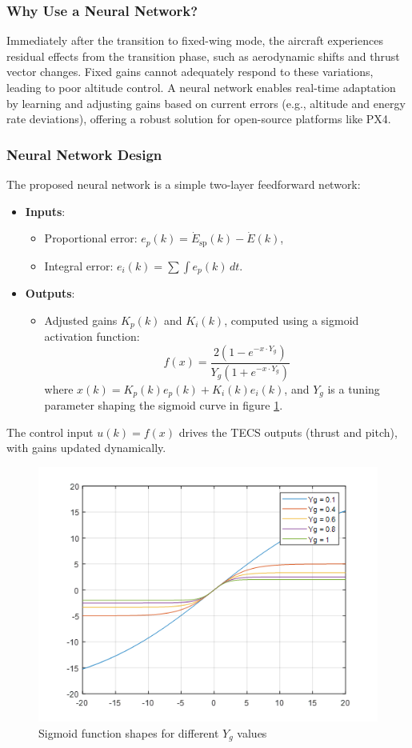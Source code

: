 \documentclass[journal,article,submit,pdftex,moreauthors]{Definitions/mdpi}
\begin{document}
\subsubsection{Why Use a Neural Network?}
Immediately after the transition to fixed-wing mode, the aircraft experiences residual effects from the transition phase, such as aerodynamic shifts and thrust vector changes. Fixed gains cannot adequately respond to these variations, leading to poor altitude control. A neural network enables real-time adaptation by learning and adjusting gains based on current errors (e.g., altitude and energy rate deviations), offering a robust solution for open-source platforms like PX4.

\subsubsection{Neural Network Design}
The proposed neural network is a simple two-layer feedforward network:
\begin{itemize}
    \item \textbf{Inputs}:
    \begin{itemize}
        \item Proportional error: \(e_p(k) = \dot{E}_{\text{sp}}(k) - \dot{E}(k)\),
        \item Integral error: \(e_i(k) = \sum \int e_p(k) \, dt\).
    \end{itemize}
    \item \textbf{Outputs}:
    \begin{itemize}
        \item Adjusted gains \(K_p(k)\) and \(K_i(k)\), computed using a sigmoid activation function:
        \begin{equation}
            f(x) = \frac{2(1 - e^{-x \cdot Y_g})}{Y_g (1 + e^{-x \cdot Y_g})}
        \end{equation}
        where \(x(k) = K_p(k)e_p(k) + K_i(k)e_i(k)\), and \(Y_g\) is a tuning parameter shaping the sigmoid curve in figure \ref{fig:sigmoid_function_shapes}.
    \end{itemize}
\end{itemize}

The control input \(u(k) = f(x)\) drives the TECS outputs (thrust and pitch), with gains updated dynamically.

\begin{figure}[H]
    \centering
    \includegraphics[width=0.6\linewidth]{sigmoid_function_shapes.png}
    \caption{Sigmoid function shapes for different \(Y_g\) values}
    \label{fig:sigmoid_function_shapes}
\end{figure}
\end{document}
